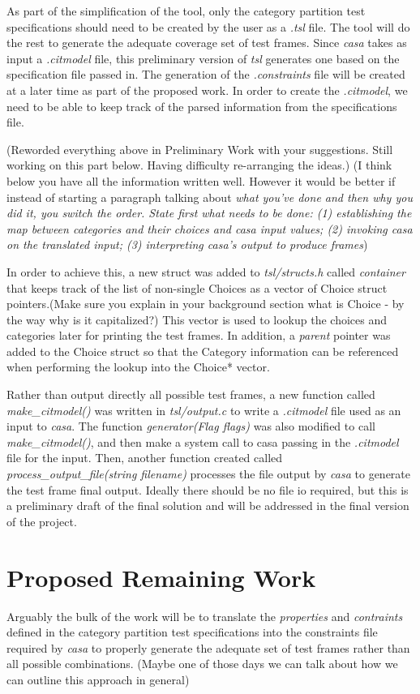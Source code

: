\documentclass[a4full,12pt]{article}
\newcommand{\eas}[1]{{\color{blue}\sf ({#1})}}
\newcommand{\ag}[1]{{\color{red}\sf ({#1})}}
\begin{document}
As part of the simplification of the tool, only the category partition test specifications
  should need to be created by the user as a \emph{.tsl} file. The tool will do the rest to
  generate the adequate coverage set of test frames. Since \emph{casa} takes as input a 
  \emph{.citmodel} file, this preliminary version of \emph{tsl} generates one based on the
  specification file passed in. The generation of the \emph{.constraints} file will be created
  at a later time as part of the proposed work. In order to create the \emph{.citmodel}, we need
  to be able to keep track of the parsed information from the specifications file.
  
\ag{Reworded everything above in Preliminary Work with your suggestions. Still working on this part below. Having difficulty re-arranging the ideas.}    
\eas{I think below you have all the information written well. However it would be better if instead of starting a paragraph
  talking about \em{what you've done} and then \em{why you did it}, you switch the order. State first what needs to be done:
  (1) establishing the map between categories and their choices and casa input values;
  (2) invoking casa on the translated input;
  (3) interpreting casa's output to produce frames}
  
In order to achieve this, a new struct was added to \emph{tsl/structs.h} called \emph{container} that
  keeps track of the list of non-single Choices as a vector of Choice struct
  pointers.\eas{Make sure you explain in your background section what is Choice - by the way why is it capitalized?} This vector is used to lookup the choices and categories later for
  printing the test frames. In addition, a \emph{parent} pointer was added to
  the Choice struct so that the Category information can be referenced when
  performing the lookup into the Choice* vector.
  
Rather than output directly all possible test frames, a new function called
  \emph{make\_citmodel()} was written in \emph{tsl/output.c} to write a 
  \emph{.citmodel} file used as an input to \emph{casa}. The function
  \emph{generator(Flag flags)} was also modified to call \emph{make\_citmodel()},
  and then make a system call to casa passing in the \emph{.citmodel} file for
  the input. Then, another function created  called
  \emph{process\_output\_file(string filename)} processes the file output by
  \emph{casa} to generate the test frame final output. Ideally there should be
  no file io required, but this is a preliminary draft of the final solution
  and will be addressed in the final version of the project.
  
  \section{Proposed Remaining Work}
Arguably the bulk of the work will be to translate the \emph{properties} and 
  \emph{contraints} defined in the category partition test specifications into
  the constraints file required by \emph{casa} to properly generate the adequate
  set of test frames rather than all possible combinations. \eas{Maybe one of those days we can talk about how we can outline this approach in general}
\end{document}
